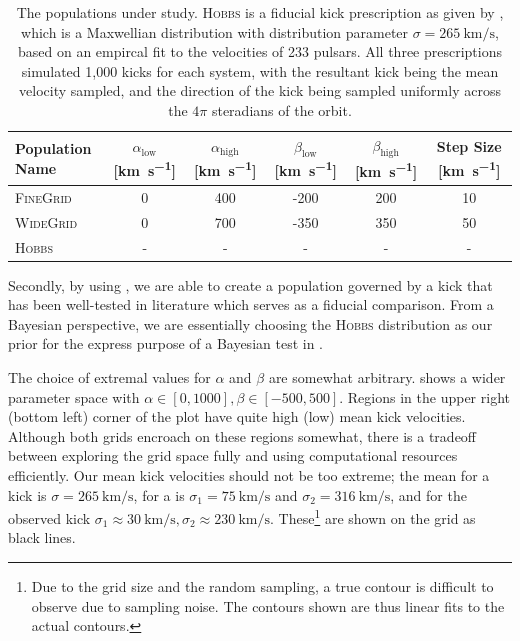\begin{table}[h]
    \centering

    \begin{tabular}{l|cc|cc|c}
        \toprule
        \textbf{Population Name} & $\alpha_\text{low}$ [\unit{\km\per\s}] & $\alpha_\text{high}$ [\unit{\km\per\s}] & $\beta_\text{low}$ [\unit{\km\per\s}] & $\beta_\text{high}$ [\unit{\km\per\s}] & Step Size [\unit{\km\per\s}] \\
        \midrule
            \textsc{FineGrid} & 0 & 400 & -200 & 200 & 10 \\
            \textsc{WideGrid} & 0 & 700 & -350 & 350 & 50 \\
            \textsc{Hobbs} & - & - & - & - & - \\
        \bottomrule
    \end{tabular}

    \caption[The populations under study.]{The populations under study. \textsc{Hobbs} is a fiducial kick prescription as given by \citet{Hobbs:2005}, which is a Maxwellian distribution with distribution parameter $\sigma=\SI{265}{\km\per\s}$, based on an empircal fit to the velocities of 233 pulsars. All three prescriptions simulated 1,000 kicks for each system, with the resultant kick being the mean velocity sampled, and the direction of the kick being sampled uniformly across the $4\pi$ steradians of the orbit.}
    \label{tab:populations}
\end{table}

Secondly, by using \citet{Hobbs:2005}, we are able to create a population governed by a kick that has been well-tested in literature \citep[see, for example,][]{Bouffanais:2021, Broekgaarden:2021, Fragione:2021, Igoshev:2021, Mandel:2021} which serves as a fiducial comparison. From a Bayesian perspective, we are essentially choosing the \textsc{Hobbs} distribution as our prior for the express purpose of a Bayesian test in .

The choice of extremal values for $\alpha$ and $\beta$ are somewhat arbitrary.  shows a wider parameter space with $\alpha\in\left[0, 1000\right], \beta\in\left[-500, 500\right]$. Regions in the upper right (bottom left) corner of the plot have quite high (low) mean kick velocities. Although both grids encroach on these regions somewhat, there is a tradeoff between exploring the grid space fully and using computational resources efficiently. Our mean kick velocities should not be too extreme; the mean for a \citet{Hobbs:2005} kick is $\sigma=\SI{265}{\km\per\s}$, for a \citet{Verbunt:2017} is $\sigma_1=\SI{75}{\km\per\s}$ and $\sigma_2=\SI{316}{\km\per\s}$, and for the observed \citet{Willcox:2021} kick $\sigma_1\approx\SI{30}{\km\per\s}, \sigma_2\approx\SI{230}{\km\per\s}$. These\footnote{Due to the grid size and the random sampling, a true contour is difficult to observe due to sampling noise. The contours shown are thus linear fits to the actual contours.} are shown on the grid as black lines.

